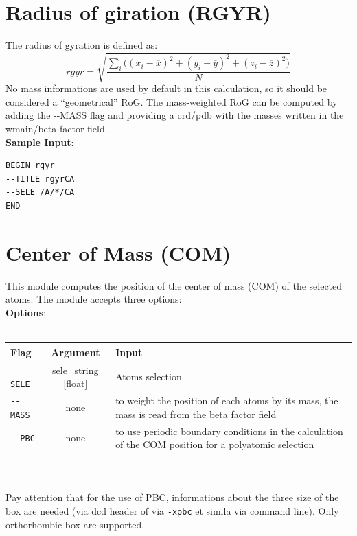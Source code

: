 \documentclass[11pt,twoside,onecolumn,a4paper,openright,notitlepage]{book}[2001/04/21]
\begin{document}
\section{Radius of giration (RGYR)}
The radius of gyration is defined as:\\ 
\begin{equation}
rgyr = \sqrt{\frac{\sum_{i} \Big((x_{i}-\overline{x})^{2}+(y_{i}-\overline{y})^{2}+(z_{i}-\overline{z})^{2}\Big)}{N}}
\end{equation}
No mass informations are used by default in this calculation, so it should be considered a ``geometrical'' RoG. The mass-weighted RoG can be computed by adding the -{}-MASS flag and providing a crd/pdb with the masses written in the wmain/beta factor field.\\

\textbf{\large Sample Input}:
\begin{verbatim}
BEGIN rgyr
--TITLE rgyrCA
--SELE /A/*/CA
END
\end{verbatim}
\clearpage


\section{Center of Mass (COM)}

This module computes the position of the center of mass (COM) of the selected atoms. The module accepts three options: \\

\textbf{\large Options}:\\\\
\begin{tabular}{l|c|p{7.0cm}}
Flag & Argument & Input \\
\hline
\verb=--SELE=    & sele\_string [float]     & Atoms selection\\
\verb=--MASS=    & none                     & to weight the position of each atoms by its mass, the mass is read from the beta factor field\\
\verb=--PBC=     & none                     & to use periodic boundary conditions in the calculation of the COM position for a polyatomic selection\cite{baybren}
\end{tabular}\\\\

Pay attention that for the use of PBC, informations about the three size of the box are needed (via dcd header of via \verb=-xpbc= et simila via command line). Only orthorhombic box are supported.
\end{document}
